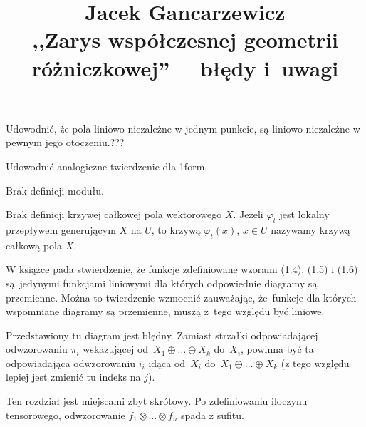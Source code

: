 \documentclass[a4paper,11pt]{article}
\title{ %
  Jacek Gancarzewicz \\
  ,,Zarys współczesnej geometrii różniczkowej'' --~błędy i~uwagi}
\begin{document}



\maketitle %




\noi {} \Dok \start Udowodnić, że pola liniowo
niezależne w jednym punkcie, są liniowo niezależne w pewnym jego
otoczeniu.???

\vspace{\spaceFour}


\start Udowodnić analogiczne twierdzenie dla 1\dywiz form.

\vspace{\spaceFour}


\start Brak definicji modułu.

\vspace{\spaceFour}


\start Brak definicji krzywej całkowej pola wektorowego $X$. Jeżeli
$\varphi_{ t }$ jest lokalny przepływem generującym $X$ na $U$, to
krzywą $\varphi_{ t }( x )$, $x \in U$ nazywamy krzywą całkową pola
$X$.

\vspace{\spaceFour}


\start {} W książce pada stwierdzenie, że funkcje zdefiniowane
wzorami (1.4), (1.5) i (1.6) są~jedynymi funkcjami liniowymi dla
których odpowiednie diagramy są przemienne. Można to twierdzenie
wzmocnić zauważając, że~funkcje dla których wspomniane diagramy są
przemienne, muszą z~tego względu być liniowe.

\vspace{\spaceFour}


\start {} Przedstawiony tu diagram jest błędny. Zamiast strzałki
odpowiadającej odwzorowaniu $\pi_{ i }$ wskazującej
od~$X_{ 1 } \oplus \ldots \oplus X_{ k }$ do~$X_{ i }$, powinna być ta
odpowiadająca odwzorowaniu $i_{ i }$ idąca od~$X_{ i }$
do~$X_{ 1 } \oplus \ldots \oplus X_{ k }$ (z tego względu lepiej jest
zmienić tu indeks na $j$).

\vspace{\spaceFour}


\start {} Ten rozdział jest miejscami zbyt skrótowy. Po
zdefiniowaniu iloczynu tensorowego, odwzorowanie
$f_{ 1 } \otimes \ldots \otimes f_{ n }$ spada z sufitu.
\end{document}

